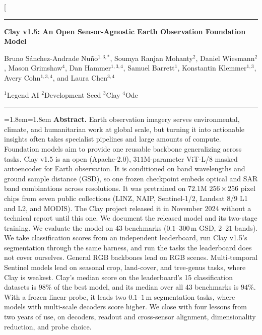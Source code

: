 \documentclass[10pt,twocolumn,letterpaper]{article}
\begin{document}
\twocolumn[{%
\begin{@twocolumnfalse}
\thispagestyle{plain}
{\noindent\color{ClayNavy}\rule{\textwidth}{1.5pt}\par\smallskip}
{\LARGE\bfseries\color{ClayNavy}\noindent Clay v1.5: An Open Sensor-Agnostic Earth Observation \mbox{Foundation} Model\par\smallskip}
{\normalsize\bfseries\raggedright\noindent
Bruno S\'anchez-Andrade Nu\~no$^{1,3,\ast}$,
Soumya Ranjan Mohanty$^{2}$,
Daniel Wiesmann$^{2}$,
Mason Grimshaw$^{4}$,
Dan Hammer$^{1,3,4}$,
Samuel Barrett$^{1}$,
Konstantin Klemmer$^{1,3}$,
Avery Cohn$^{1,3,4}$,
and Laura Chen$^{3,4}$\par\smallskip}
{\footnotesize\color{ClaySlate}\noindent
$^{1}$Legend AI \quad
$^{2}$Development Seed \quad
$^{3}$Clay \quad
$^{4}$Ode\par\smallskip}
{\noindent\color{RuleGrey}\rule{\textwidth}{0.6pt}\par\smallskip}
{\small\leftskip=1.8em\rightskip=1.8em\parindent=0pt
\textbf{\textcolor{ClayNavy}{Abstract.}}
Earth observation imagery serves environmental, climate, and humanitarian work at global scale, but turning it into actionable insights often takes specialist pipelines and large amounts of compute. Foundation models aim to provide one reusable backbone generalizing across tasks. Clay v1.5 is an open (Apache-2.0), $311\text{M}$-parameter ViT-L/8 masked autoencoder for Earth observation. It is conditioned on band wavelengths and ground sample distance (GSD), so one frozen checkpoint embeds optical and SAR band combinations across resolutions. It was pretrained on $72.1\text{M}$ $256\times 256$ pixel chips from seven public collections (LINZ, NAIP, Sentinel-1/2, Landsat 8/9 L1 and L2, and MODIS). The Clay project released it in November 2024 without a technical report until this one. We document the released model and its two-stage training. We evaluate the model on 43 benchmarks ($0.1\text{--}300\,\text{m}$ GSD, $2\text{--}21$ bands). We take classification scores from an independent leaderboard, run Clay v1.5's segmentation through the same harness, and run the tasks the leaderboard does not cover ourselves. General RGB backbones lead on RGB scenes. Multi-temporal Sentinel models lead on seasonal crop, land-cover, and tree-genus tasks, where Clay is weakest. Clay's median score on the leaderboard's 15 classification datasets is $98\%$ of the best model, and its median over all 43 benchmarks is $94\%$. With a frozen linear probe, it leads two $0.1\text{--}1\,\text{m}$ segmentation tasks, where models with multi-scale decoders score higher. We close with four lessons from two years of use, on decoders, readout and cross-sensor alignment, dimensionality reduction, and probe choice.\par\smallskip
}
\end{@twocolumnfalse}}
\end{document}
